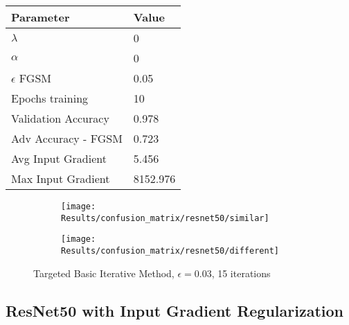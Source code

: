\documentclass[draft,final]{vutinfth} %
\begin{document}
\begin{table}[h]
  \centering
  \begin{tabular}{ll}
    \toprule
			Parameter			& Value   \\
    \midrule
			$\lambda$								& 0				\\
			$\alpha$								& 0				\\
			$\epsilon$ FGSM					& 0.05		\\
			Epochs training					& 10			\\
			
			Validation Accuracy			& 0.978		\\ 
			Adv Accuracy - FGSM			& 0.723		\\
			
			Avg Input Gradient			& 5.456		\\
			Max Input Gradient			& 8152.976\\
    \bottomrule
  \end{tabular}
\end{table}


\begin{figure}[h]
  \begin{subfigure}[b]{0.5\columnwidth}
		\centering
    \texttt{[image: Results/confusion\_matrix/resnet50/similar]}
    \label{fig:exp:cm:resnet50:similar}
  \end{subfigure}
  \begin{subfigure}[b]{0.5\columnwidth}
		\centering
    \texttt{[image: Results/confusion\_matrix/resnet50/different]}
    \label{fig:exp:cm:resnet50:different}
  \end{subfigure}
  \caption{Targeted Basic Iterative Method, $\epsilon = 0.03$, 15 iterations}
  \label{fig:exp:cm:resnet50}
\end{figure}
\clearpage

\subsection{ResNet50 with Input Gradient Regularization}
\end{document}
